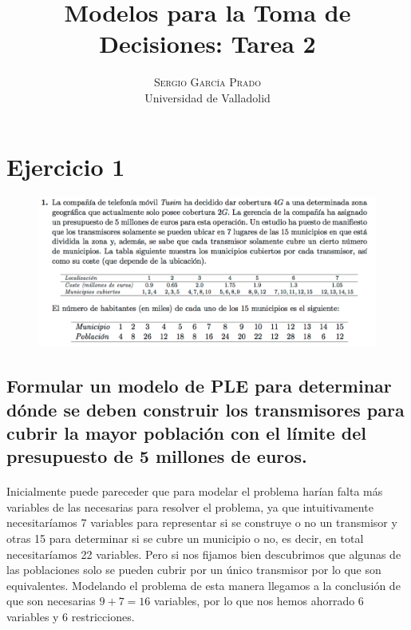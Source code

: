 \documentclass[10pt, a4paper]{article}
\title{\vspace{-15mm}\fontsize{24pt}{10pt}\selectfont\textbf{Modelos para la Toma de Decisiones: Tarea 2}} %
\author{
\large
\textsc{Sergio García Prado}\\[2mm] %
\normalsize Universidad de Valladolid \\ %
\vspace{-5mm}
}
\date{}
\begin{document}
	\maketitle %

	\thispagestyle{fancy} %


    \section{Ejercicio 1}

        \begin{figure}[H]
        \centering
            \includegraphics[width=\textwidth]{res/exercise-1.png}
        \end{figure}


		\subsection{Formular un modelo de PLE para determinar dónde se deben construir los transmisores para cubrir la mayor población con el límite del presupuesto de 5 millones de euros.}

			\paragraph{}
			Inicialmente puede pareceder que para modelar el problema harían falta más variables de las necesarias para resolver el problema, ya que intuitivamente necesitaríamos 7 variables para representar si se construye o no un transmisor y otras 15 para determinar si se cubre un municipio o no, es decir, en total necesitaríamos 22 variables. Pero si nos fijamos bien descubrimos que algunas de las poblaciones solo se pueden cubrir por un único transmisor por lo que son equivalentes. Modelando el problema de esta manera llegamos a la conclusión de que son necesarias $9 + 7 = 16$ variables, por lo que nos hemos ahorrado 6 variables y 6 restricciones.
\end{document}
